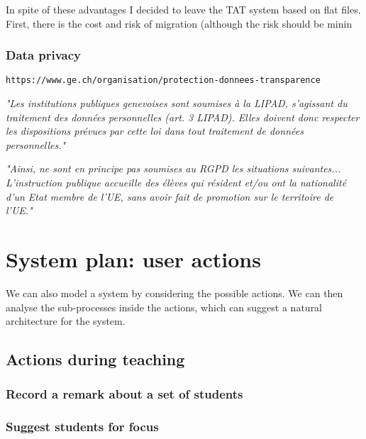 \documentclass[10pt]{article}
\begin{document}
In spite of these advantages I decided to leave the TAT system based on flat files. First, there is the cost and risk of migration (although the risk should be minin

\subsubsection{Data privacy} \label{dataprivacy}

\texttt{https://www.ge.ch/organisation/protection-donnees-transparence}

\begin{center} 
\emph{"Les institutions publiques genevoises sont soumises à la LIPAD, s'agissant du traitement des données personnelles (art. 3 LIPAD). Elles doivent donc respecter les dispositions prévues par cette loi dans tout traitement de données personnelles."}\cite[p. 1]{PPDT18}
\end{center}

\begin{center} 
\emph{"Ainsi, ne sont en principe pas soumises au RGPD les situations suivantes... L’instruction publique accueille des élèves qui résident et/ou ont la nationalité d’un Etat membre de l’UE, sans avoir fait de promotion sur le territoire de l’UE."}\cite[p. 3]{PPDT18}
\end{center}




\iffalse
\section{System plan: user actions} \label{actions}

We can also model a system by considering the possible actions. We can then analyse the sub-processes inside the actions, which can suggest a natural architecture for the system.



\subsection{Actions during teaching}

\subsubsection{Record a remark about a set of students}

\subsubsection{Suggest students for focus}
\end{document}
